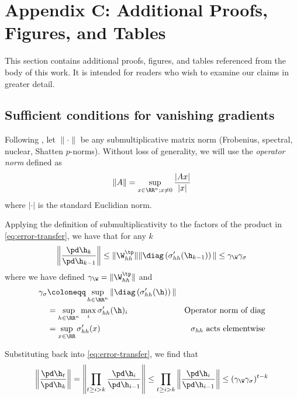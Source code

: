 \chapter{Appendix C: Additional Proofs, Figures, and Tables}

\ifpdf
    \graphicspath{{Appendix3/Figs/Raster/}{Appendix3/Figs/PDF/}{Appendix3/Figs/}}
\else
    \graphicspath{{Appendix3/Figs/Vector/}{Appendix3/Figs/}}
\fi

This section contains additional proofs, figures, and tables referenced from
the body of this work. It is intended for readers who wish to examine our
claims in greater detail.

\section{Sufficient conditions for vanishing gradients}\label{sec:vanishing-exploding-gradients}

Following \citet{Pascanu2012}, let $\| \cdot \|$ be any
submultiplicative matrix norm (\eg Frobenius, spectral, nuclear, Shatten
$p$-norms). Without loss of generality, we will use the \emph{operator norm}
defined as
\begin{equation}\label{eq:operator-norm}
    \| A \| = \sup_{x \in \RR^n; x \neq 0} \frac{|A x|}{|x|}
\end{equation}
where $|\cdot|$ is the standard Euclidian norm.

Applying the definition of submultiplicativity to the factors of
the product in \cref{eq:error-transfer}, we have that for any $k$
\begin{equation}
    \left\| \frac{\pd \h_k}{\pd \h_{k-1}} \right\|
    \leq \| \W_{hh}^\tp \| \| \diag\left( \sigma_{hh}'(\h_{k-1}) \right) \|
    \leq \gamma_{\W} \gamma_\sigma
\end{equation}
where we have defined $\gamma_{\W} = \| \W_{hh}^\tp \|$ and
\begin{align}
    \gamma_\sigma
    &\coloneqq \sup_{h \in \RR^n} \| \diag \left( \sigma_{hh}'(\h) \right) \|  &\\
    &= \sup_{h \in \RR^n} \max_i \sigma_{hh}'(\h)_i &\mbox{Operator norm of diag} \\
    &= \sup_{x \in \RR} \sigma_{hh}'(x) &\mbox{$\sigma_{hh}$ acts elementwise}
\end{align}

Substituting back into \cref{eq:error-transfer}, we find that
\begin{equation}
    \left\| \frac{\pd \h_t}{\pd \h_k} \right\|
    = \left\| \prod_{t \geq i > k} \frac{\pd \h_i}{\pd \h_{i-1}} \right\|
    \leq  \prod_{t \geq i > k} \left\| \frac{\pd \h_i}{\pd \h_{i-1}} \right\|
    \leq (\gamma_{\W} \gamma_\sigma)^{t-k}
\end{equation}

